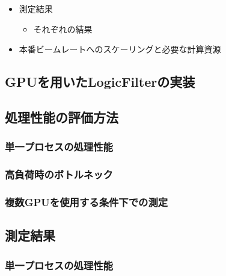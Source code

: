 \documentclass[../main.tex]{subfiles}
\begin{document}
\begin{tcolorbox}[
  title=執筆メモ,
  colback=yellow!8,
  colframe=black!30,
  breakable
]
\begin{itemize}
  \begin{itemize}
    \item 単一プロセスの処理性能
    \begin{itemize}
      \item どこにどれくらい時間がかかっているか
      \item T103の実データでデータサイズvs処理時間
      \item サブグループ数を変えたときの処理性能の変化
      \item 仮想的にデータレートを上げたときの処理性能の変化
    \end{itemize}
    \item 複数プロセスの処理性能
    \item 複数プロセス・複数GPUを使用する条件下での測定
  \end{itemize}
  \item 測定結果
  \begin{itemize}
    \item それぞれの結果
  \end{itemize}
  \item 本番ビームレートへのスケーリングと必要な計算資源
\end{itemize}
\end{tcolorbox}

\subsection{GPUを用いたLogicFilterの実装}

\subsection{処理性能の評価方法}
\subsubsection{単一プロセスの処理性能}
\subsubsection{高負荷時のボトルネック}
\subsubsection{複数GPUを使用する条件下での測定}

\subsection{測定結果}
\subsubsection{単一プロセスの処理性能}
\end{document}
